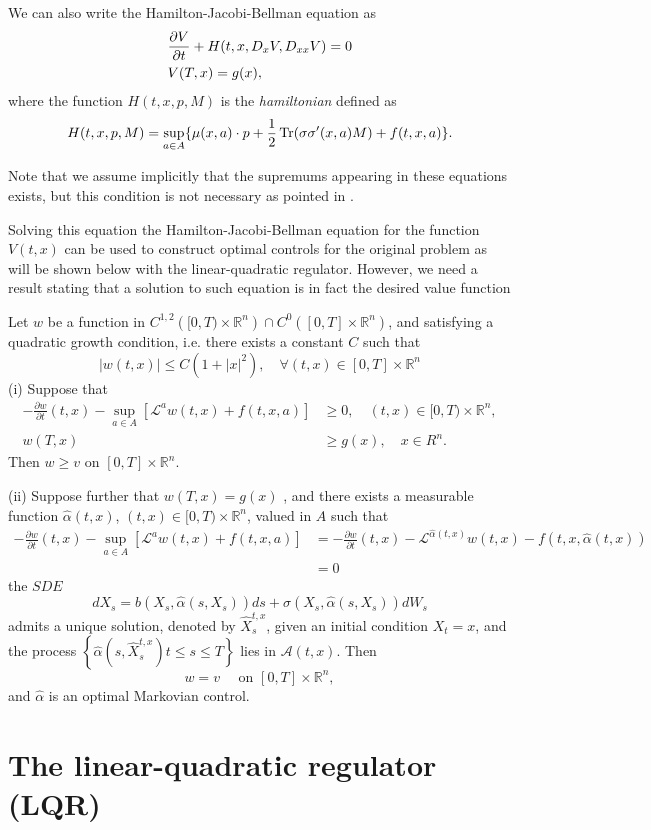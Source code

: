 We can also write the Hamilton-Jacobi-Bellman equation as 
\begin{equation}
		\begin{split}
		&\frac{\partial V}{\partial t}+H(t,x,D_x V,D_{xx} V)=0\\
		&V(T,x)=g(x),
	\end{split}
\end{equation}
where the function $H(t,x,p,M)$ is the \textit{hamiltonian} defined as
\begin{equation}
	H(t,x,p,M)=\sup_{a\in A}\{\mu(x,a)\cdot p+\frac{1}{2}\operatorname{Tr} (\sigma\sigma'(x,a)M)+f(t,x,a)\}.
\end{equation}

Note that we assume implicitly that the supremums appearing in these equations exists, but this condition is not necessary as pointed in \cite{pham_continuous-time_2009}.

Solving this equation the Hamilton-Jacobi-Bellman equation for the function $V(t,x)$ can be used to construct optimal controls for the original problem as will be shown below with the linear-quadratic regulator. However, we need a result stating that a solution to such equation is in fact the desired value function
\begin{thm}
	Let $w$ be a function in $C^{1,2}\left([0, T) \times \mathbb{R}^n\right) \cap C^0\left([0, T] \times \mathbb{R}^n\right)$, and satisfying a quadratic growth condition, i.e. there exists a constant $C$ such that
	$$
	|w(t, x)| \leq C\left(1+|x|^2\right), \quad \forall(t, x) \in[0, T] \times \mathbb{R}^n
	$$
	(i) Suppose that
	$$
	\begin{aligned}
		-\frac{\partial w}{\partial t}(t, x)-\sup _{a \in A}\left[\mathcal{L}^a w(t, x)+f(t, x, a)\right] & \geq 0, \quad(t, x) \in[0, T) \times \mathbb{R}^n, \\
		w(T, x) & \geq g(x), \quad x \in R^n .
	\end{aligned}
	$$
	Then $w \geq v$ on $[0, T] \times \mathbb{R}^n$.
	
	(ii) Suppose further that $w(T,x)=g(x)$ , and there exists a measurable function $\hat{\alpha}(t, x)$, $(t, x) \in[0, T) \times \mathbb{R}^n$, valued in $A$ such that
	$$
	\begin{aligned}
		-\frac{\partial w}{\partial t}(t, x)-\sup _{a \in A}\left[\mathcal{L}^a w(t, x)+f(t, x, a)\right] & =-\frac{\partial w}{\partial t}(t, x)-\mathcal{L}^{\hat{\alpha}(t, x)} w(t, x)-f(t, x, \hat{\alpha}(t, x)) \\
		& =0
	\end{aligned}
	$$
	the $S D E$
	$$
	d X_s=b\left(X_s, \hat{\alpha}\left(s, X_s\right)\right) d s+\sigma\left(X_s, \hat{\alpha}\left(s, X_s\right)\right) d W_s
	$$
	admits a unique solution, denoted by $\hat{X}_s^{t, x}$, given an initial condition $X_t=x$, and the process $\left\{\hat{\alpha}\left(s, \hat{X}_s^{t, x}\right) t \leq s \leq T\right\}$ lies in $\mathcal{A}(t, x)$. Then
	$$
	w=v \quad \text { on }[0, T] \times \mathbb{R}^n,
	$$
	and $\hat{\alpha}$ is an optimal Markovian control.
\end{thm}
\section*{The linear-quadratic regulator (LQR)}